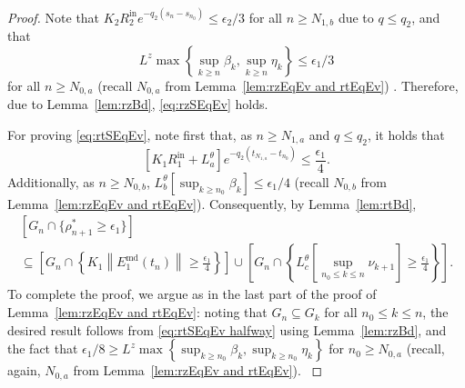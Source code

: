 \documentclass[usenames,dvipsnames,final,12pt]{colt2018} %
\newcommand{\et}{\epsilon_1}
\newcommand{\etg}{R_1^{\textrm{gap}}}
\newcommand{\Rti}{R_1^{\textrm{in}}}
\newcommand{\rtS}{\rho^{*}}
\newcommand{\Et}{E_1}
\newcommand{\Kt}{K_1}
\newcommand{\EtM}{\Et^{\md}}
\newcommand{\Lt}[1]{L^{\theta}_{#1}}
\newcommand{\lz}{q_2}
\newcommand{\ez}{\epsilon_2}
\newcommand{\Rzi}{R_2^{\textrm{in}}}
\newcommand{\rz}{\nu}
\newcommand{\Lz}{L^z}
\newcommand{\Kz}{K_2}
\newcommand{\N}[1]{N_{0,#1}}
\newcommand{\n}[1]{N_{1,#1}}
\newcommand{\lm}{q}
\newcommand{\md}{\text{md}}
\newcommand{\tI}[1]{t_{#1}}
\newcommand{\sI}[1]{s_{#1}}
\newcommand{\norm}[1]{\left\lVert#1\right\rVert}
\newcommand{\gal}[1]{#1}
\begin{document}
\begin{proof}
{
	Note  that
	\(
	\Kz \Rzi e^{-\lz(\sI{n} - \sI{n_0})} \leq \ez/3
	\)
	for all $n\geq \n{b}$ due to $\lm \leq \lz$,
	and that
	$$
	\Lz \max \left\{\sup_{k \geq n} \beta_k, \sup_{k \geq n} \eta_k \right\}  \leq \et/3
	$$
	for all $n\geq \N{a}$ (recall $\N{a}$ from Lemma~\ref{lem:rzEqEv and rtEqEv})
	. Therefore, due to Lemma~\ref{lem:rzBd},  \eqref{eq:rzSEqEv} holds.
}


{
For proving \eqref{eq:rtSEqEv}, note first that,
as $n \geq \n{a}$ and $\lm \leq \lz$, it holds that $$[\Kt \Rti + \Lt{a}] e^{-\lz(\tI{\n{a}} - \tI{n_0})} \leq \frac{\et}{4}.$$
Additionally, as $n \geq \N{b}$, $\Lt{b} \left[\sup_{k \geq n_0} \beta_k \right] \leq \et/4$
(recall $\N{b}$ from Lemma~\ref{lem:rzEqEv and rtEqEv}). %
Consequently, by Lemma~\ref{lem:rtBd},
%
\begin{multline}
\label{eq:rtSEqEv halfway}
[ G_n \cap \{\rtS_{n + 1} \geq \et\}] \\
\subseteq \left[ G_n \cap \left\{ \Kt \norm{\EtM(\tI{n})} \geq \frac{{\et}}{4}\right\}\right] \cup \left[ G_n \cap \left\{ \Lt{c} \left[ \sup_{n_0 \leq k \leq n} \rz_{k + 1}\right]  \geq \frac{{\et}}{4}\right\}\right].
\end{multline}
%
To complete the proof, we argue as in the last part of the proof of Lemma~\ref{lem:rzEqEv and rtEqEv}: noting that %
$G_n \subseteq G_k$ for all $n_0 \leq k \leq n$, the desired result follows from \eqref{eq:rtSEqEv halfway}
using Lemma~\ref{lem:rzBd},
and the fact that $\et/8 \geq \Lz \max \left\{\sup_{k \geq n_0} \beta_k, \sup_{k \geq n_0} \eta_k \right\}$ for $n_0 \geq \N{a}$ (recall, again, $\N{a}$ from Lemma~\ref{lem:rzEqEv and rtEqEv}).
}
\end{proof}
\end{document}
